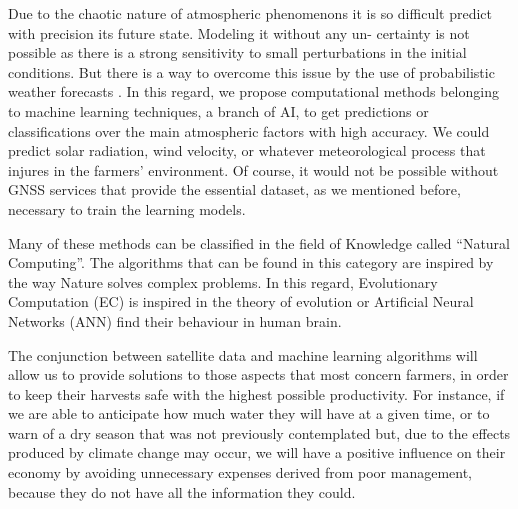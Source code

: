 Due to the chaotic nature of atmospheric phenomenons it is so difficult predict with precision its future state. Modeling it without any un- certainty is not possible as there is a strong sensitivity to small perturbations in the initial conditions. But there is a way to overcome this issue by the use of probabilistic weather forecasts \cite{martinez2015forecasting}. In this regard, we propose computational methods belonging to machine learning techniques, a branch of AI, to get predictions or classifications over the main atmospheric factors with high accuracy. We could predict solar radiation, wind velocity, or whatever meteorological process that injures in the farmers' environment. Of course, it would not be possible without GNSS services that provide the essential dataset, as we mentioned before, necessary to train the learning models.

Many of these methods can be classified in the field of Knowledge called “Natural Computing”. The algorithms that can be found in this category are inspired by the way Nature solves complex problems. In this regard, Evolutionary Computation (EC) is inspired in the theory of evolution or Artificial Neural Networks (ANN) find their behaviour in human brain.

The conjunction between satellite data and machine learning algorithms will allow us to provide solutions to those aspects that most concern farmers, in order to keep their harvests safe with the highest possible productivity. For instance, if we are able to anticipate how much water they will have at a given time, or to warn of a dry season that was not previously contemplated but, due to the effects produced by climate change may occur, we will have a positive influence on their economy by avoiding unnecessary expenses derived from poor management, because they do not have all the information they could.

